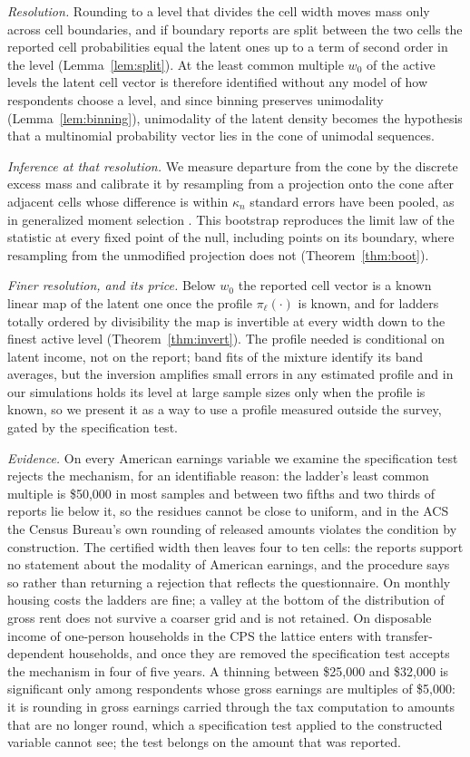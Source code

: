 \emph{Resolution.} Rounding to a level that divides the cell width moves mass only across cell boundaries, and if boundary reports are split between the two cells the reported cell probabilities equal the latent ones up to a term of second order in the level (Lemma~\ref{lem:split}). At the least common multiple $w_0$ of the active levels the latent cell vector is therefore identified without any model of how respondents choose a level, and since binning preserves unimodality (Lemma~\ref{lem:binning}), unimodality of the latent density becomes the hypothesis that a multinomial probability vector lies in the cone of unimodal sequences.

\emph{Inference at that resolution.} We measure departure from the cone by the discrete excess mass and calibrate it by resampling from a projection onto the cone after adjacent cells whose difference is within $\kappa_n$ standard errors have been pooled, as in generalized moment selection \citep{AndrewsSoares2010}. This bootstrap reproduces the limit law of the statistic at every fixed point of the null, including points on its boundary, where resampling from the unmodified projection does not (Theorem~\ref{thm:boot}).

\emph{Finer resolution, and its price.} Below $w_0$ the reported cell vector is a known linear map of the latent one once the profile $\pi_\ell(\cdot)$ is known, and for ladders totally ordered by divisibility the map is invertible at every width down to the finest active level (Theorem~\ref{thm:invert}). The profile needed is conditional on latent income, not on the report; band fits of the mixture identify its band averages, but the inversion amplifies small errors in any estimated profile and in our simulations holds its level at large sample sizes only when the profile is known, so we present it as a way to use a profile measured outside the survey, gated by the specification test.

\emph{Evidence.} On every American earnings variable we examine the specification test rejects the mechanism, for an identifiable reason: the ladder's least common multiple is \$50{,}000 in most samples and between two fifths and two thirds of reports lie below it, so the residues cannot be close to uniform, and in the ACS the Census Bureau's own rounding of released amounts violates the condition by construction. The certified width then leaves four to ten cells: the reports support no statement about the modality of American earnings, and the procedure says so rather than returning a rejection that reflects the questionnaire. On monthly housing costs the ladders are fine; a valley at the bottom of the distribution of gross rent does not survive a coarser grid and is not retained. On disposable income of one-person households in the CPS the lattice enters with transfer-dependent households, and once they are removed the specification test accepts the mechanism in four of five years. A thinning between \$25{,}000 and \$32{,}000 is significant only among respondents whose gross earnings are multiples of \$5{,}000: it is rounding in gross earnings carried through the tax computation to amounts that are no longer round, which a specification test applied to the constructed variable cannot see; the test belongs on the amount that was reported.

